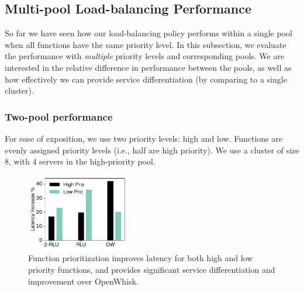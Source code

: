 \subsection{Multi-pool Load-balancing Performance}
\label{subsec:eval-multipool}
So far we have seen how our load-balancing policy performs within a single pool when all functions have the same priority level.
In this subsection, we evaluate the performance with \emph{multiple} priority levels and corresponding pools.
We are interested in the relative difference in performance between the pools, as well as how effectively we can provide service differentiation (by comparing to a single cluster).

\subsubsection{Two-pool performance}
For ease of exposition, we use two priority levels: high and low.
Functions are evenly assigned priority levels (i.e., half are high priority).
We use a cluster of size 8, with 4 servers in the high-priority pool. 


\begin{figure}
  \centering  \includegraphics[width=0.4\textwidth]{../Figures/fixed/qos1.pdf} %
  \caption{Function prioritization improves latency for both high and low priority functions, and provides significant service differentiation and improvement over OpenWhisk.}
  \label{fig:fixed-lat}
\end{figure}

